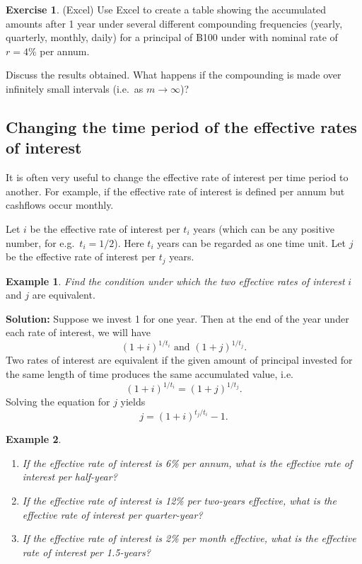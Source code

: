 \documentclass[
]{book}
\theoremstyle{definition}
\theoremstyle{definition}
\newtheorem{example}{Example}[chapter]
\theoremstyle{definition}
\newtheorem{exercise}{Exercise}[chapter]
\theoremstyle{definition}
\theoremstyle{remark}
\begin{document}
\begin{exercise}
(Excel) Use Excel to create a table showing the accumulated amounts after 1 year under several different compounding frequencies (yearly, quarterly, monthly, daily) for a principal of ฿100 under with nominal rate of \(r = 4\%\) per annum.

Discuss the results obtained. What happens if the compounding is made over infinitely small intervals (i.e.~as \(m \rightarrow \infty\))?
\end{exercise}

\hypertarget{changing-the-time-period-of-the-effective-rates-of-interest}{%
\subsection{Changing the time period of the effective rates of interest}\label{changing-the-time-period-of-the-effective-rates-of-interest}}

It is often very useful to change the effective rate of interest per
time period to another. For example, if the effective rate of interest
is defined per annum but cashflows occur monthly.

Let \(i\) be the effective rate of interest per \(t_i\) years (which can be
any positive number, for e.g.~\(t_i = 1/2\)). Here \(t_i\) years can be
regarded as one time unit. Let \(j\) be the effective rate of interest per
\(t_j\) years.

\begin{example}
\emph{Find the condition under which the two effective rates of interest} \(i\)
and \(j\) are equivalent.
\end{example}

\textbf{Solution:} Suppose we invest 1 for one year. Then at the end of the
year under each rate of interest, we will have
\[(1+i)^{1/t_i} \text{ and } (1+j)^{1/t_j}.\] Two rates of interest are
equivalent if the given amount of principal invested for the same length
of time produces the same accumulated value, i.e.
\[(1+i)^{1/t_i} = (1+j)^{1/t_j}.\] Solving the equation for \(j\) yields
\[j = (1+i)^{t_j/t_i} - 1.\]

\begin{example}

\begin{enumerate}
\def\labelenumi{\arabic{enumi}.}
\item
  \emph{If the effective rate of interest is 6\% per annum, what is the
  effective rate of interest per half-year?}
\item
  \emph{If the effective rate of interest is 12\% per two-years effective,
  what is the effective rate of interest per quarter-year?}
\item
  \emph{If the effective rate of interest is 2\% per month effective, what
  is the effective rate of interest per 1.5-years?}
\end{enumerate}

\end{example}
\end{document}
